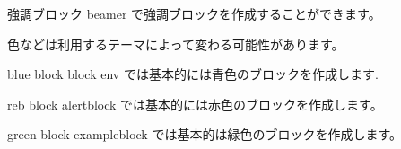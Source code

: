 \begin{frame}{強調ブロック}
    beamer で強調ブロックを作成することができます。
    
    色などは利用するテーマによって変わる可能性があります。

    \begin{block}{blue block}
        block env では基本的には青色のブロックを作成します.
    \end{block}

    \begin{alertblock}{reb block}
        alertblock では基本的には赤色のブロックを作成します。
    \end{alertblock}

    \begin{exampleblock}{green block}
        exampleblock では基本的は緑色のブロックを作成します。
    \end{exampleblock}

    
\end{frame}